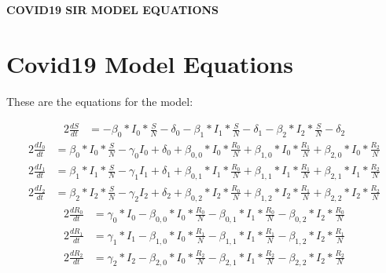 \documentclass{article}%
\begin{document}
%
\normalsize%
\begin{center}%
\section*{}%
\label{sec:}%
\begin{Large}%
\textbf{COVID19 SIR MODEL EQUATIONS}%
\end{Large}

%
\end{center}%
\section{Covid19 Model Equations}%
\label{sec:Covid19ModelEquations}%
\begin{large}%
These are the equations for the model:%
\end{large}

%
\begin{alignat*}{2}%
\frac{dS}{dt} &= -\beta_{0}*I_{0} * \frac{S}{N}- \delta_{0} -\beta_{1}*I_{1} * \frac{S}{N}- \delta_{1} -\beta_{2}*I_{2} * \frac{S}{N}- \delta_{2}%
\end{alignat*}%
\begin{alignat*}{2}%
\frac{dI_{0}}{dt} &= \beta_{0}*I_{0} * \frac{S}{N} -\gamma_{0}I_{0}+ \delta_{0} +  \beta_{0,0} * I_{0} * \frac{R_{0}}{N} +  \beta_{1,0} * I_{0} * \frac{R_{1}}{N} +  \beta_{2,0} * I_{0} * \frac{R_{2}}{N}%
\end{alignat*}%
\begin{alignat*}{2}%
\frac{dI_{1}}{dt} &= \beta_{1}*I_{1} * \frac{S}{N} -\gamma_{1}I_{1}+ \delta_{1} +  \beta_{0,1} * I_{1} * \frac{R_{0}}{N} +  \beta_{1,1} * I_{1} * \frac{R_{1}}{N} +  \beta_{2,1} * I_{1} * \frac{R_{2}}{N}%
\end{alignat*}%
\begin{alignat*}{2}%
\frac{dI_{2}}{dt} &= \beta_{2}*I_{2} * \frac{S}{N} -\gamma_{2}I_{2}+ \delta_{2} +  \beta_{0,2} * I_{2} * \frac{R_{0}}{N} +  \beta_{1,2} * I_{2} * \frac{R_{1}}{N} +  \beta_{2,2} * I_{2} * \frac{R_{2}}{N}%
\end{alignat*}%
\begin{alignat*}{2}%
\frac{dR_{0}}{dt} &= \gamma_{0}*I_{0}- \beta_{0,0} * I_{0} * \frac{R_{0}}{N}- \beta_{0,1} * I_{1} * \frac{R_{0}}{N}- \beta_{0,2} * I_{2} * \frac{R_{0}}{N}%
\end{alignat*}%
\begin{alignat*}{2}%
\frac{dR_{1}}{dt} &= \gamma_{1}*I_{1}- \beta_{1,0} * I_{0} * \frac{R_{1}}{N}- \beta_{1,1} * I_{1} * \frac{R_{1}}{N}- \beta_{1,2} * I_{2} * \frac{R_{1}}{N}%
\end{alignat*}%
\begin{alignat*}{2}%
\frac{dR_{2}}{dt} &= \gamma_{2}*I_{2}- \beta_{2,0} * I_{0} * \frac{R_{2}}{N}- \beta_{2,1} * I_{1} * \frac{R_{2}}{N}- \beta_{2,2} * I_{2} * \frac{R_{2}}{N}%
\end{alignat*}%
\end{document}
